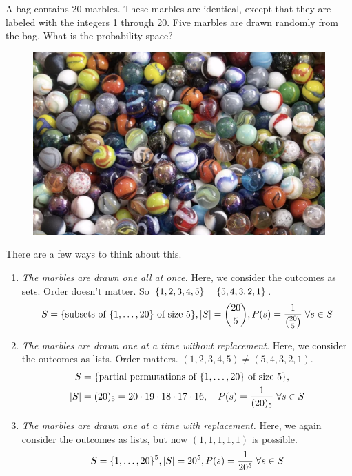 \documentclass[10pt]{beamer}
\begin{document}
\begin{frame}
\footnotesize

\begin{myyellowbox}[title=Poll]
\begin{minipage}{.83\textwidth}
A bag contains 20 marbles. These marbles are identical, except that they are labeled with the integers 1 through 20.  Five marbles are drawn randomly from the bag.  What is the probability space?
\end{minipage} %
\hfill 
\begin{minipage}{.15\textwidth}
\begin{figure}
\includegraphics[width=.9\textwidth]{images/marbles}	
\end{figure}
\end{minipage}
\end{myyellowbox}
\vfill 
\begin{myredbox}[title=\text{Solution(s):  \; The solution depends on what's meant by \enquote{randomly}!}]
There are a few ways to think about this.  \pause 
\begin{enumerate} 
	\item \textit{The marbles are drawn one all at once.} Here, we consider the outcomes as sets. Order doesn't matter. So $\{ {1,2,3,4,5} \} = \{ {5,4,3,2,1} \}$. \pause 
	\[ S = \{ {\text{subsets of $\{ {1,\hdots, 20} \}$ of size 5}} \}, |S| = \binom{20}{5}, P(s) = \frac{1}{\binom{20}{5}} \; \forall s \in S \]
	\vspace{-0.3cm}
	\pause \item \textit{The marbles are drawn one at a time without replacement.} Here, we consider the outcomes as lists. Order matters.  $(1,2,3,4,5) \neq (5,4,3,2,1)$. \pause 
	\begin{align*}
	S &= \{ {\text{partial permutations of $\{ {1,\hdots, 20} \}$ of size 5}} \}, \\
	|S| &= (20)_5 = 20 \cdot 19 \cdot 18 \cdot 17 \cdot 16, \quad 
	P(s) = \frac{1}{(20)_5} \; \forall s \in S 	
	\end{align*}
	\vspace{-0.3cm}
\pause \item \textit{The marbles are drawn one at a time with replacement.} Here, we again consider the outcomes as lists, but now $(1,1,1,1,1)$ is possible. \pause  
	\[ S =\{ {1,\hdots, 20} \}^5, |S| = 20^5, P(s) = \frac{1}{20^5} \; \forall s \in S \]
	

\end{enumerate}
\end{myredbox}
\end{frame}
\end{document}
